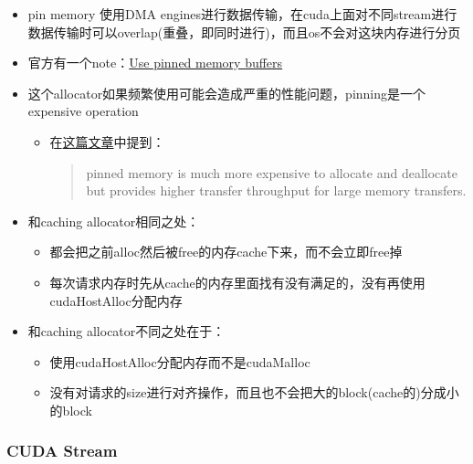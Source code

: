 \begin{itemize}
\item
  pin memory 使用DMA
  engines进行数据传输，在cuda上面对不同stream进行数据传输时可以overlap(重叠，即同时进行)，而且os不会对这块内存进行分页
\item
  官方有一个note：\href{https://pytorch.org/docs/stable/notes/cuda.html\#use-pinned-memory-buffers}{Use
  pinned memory buffers}
\item
  这个allocator如果频繁使用可能会造成严重的性能问题，pinning是一个expensive
  operation

  \begin{itemize}
  \item
    在\href{https://www.cs.virginia.edu/~mwb7w/cuda_support/pinned_tradeoff.html}{这篇文章}中提到：

    \begin{quote}
    pinned memory is much more expensive to allocate and deallocate but
    provides higher transfer throughput for large memory transfers.
    \end{quote}
  \end{itemize}
\item
  和caching allocator相同之处：

  \begin{itemize}
  \tightlist
  \item
    都会把之前alloc然后被free的内存cache下来，而不会立即free掉
  \item
    每次请求内存时先从cache的内存里面找有没有满足的，没有再使用cudaHostAlloc分配内存
  \end{itemize}
\item
  和caching allocator不同之处在于：

  \begin{itemize}
  \tightlist
  \item
    使用cudaHostAlloc分配内存而不是cudaMalloc
  \item
    没有对请求的size进行对齐操作，而且也不会把大的block(cache的)分成小的block
  \end{itemize}
\end{itemize}

\hypertarget{cuda-stream}{%
\subsubsection{CUDA Stream}\label{cuda-stream}}

